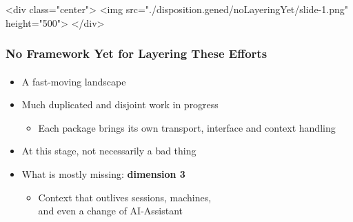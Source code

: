 \begin{whenOrg}
\begin{htmlonly}

\begin{frame}[fragile,plain,label=noLayeringYet]
    \frametitle{}
    \framesubtitle{}
    \begin{rawhtml}
<div class="center">
<img src="./disposition.gened/noLayeringYet/slide-1.png" height="500">
</div>
    \end{rawhtml}
\end{frame}
\end{htmlonly}

\begin{verblatex}

\begin{frame}[fragile,plain,label=noLayeringYet]
    \frametitle{No Framework Yet for Layering These Efforts}
    \framesubtitle{}

\begin{itemize}
  \item A fast-moving landscape
  \item Much duplicated and disjoint work in progress
    \begin{itemize}
    \item Each package brings its own transport, interface and context handling
    \end{itemize}
  \item At this stage, not necessarily a bad thing
  \item What is mostly missing: \textbf{dimension 3}
    \begin{itemize}
    \item Context that outlives sessions, machines,\\
      and even a change of AI-Assistant
    \end{itemize}
  \end{itemize}

\end{frame}
\end{verblatex}
\end{whenOrg}
